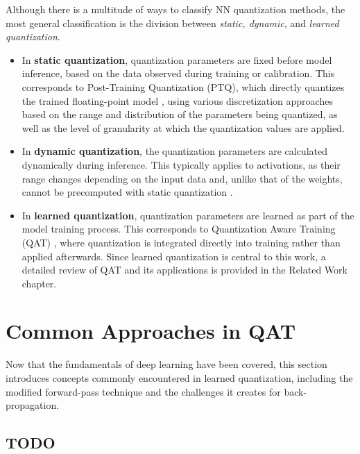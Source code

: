Although there is a multitude of ways to classify NN quantization methods, the most general classification is the division between \textit{static, dynamic}, and \textit{learned quantization}.
    \begin{itemize}
        \item In \textbf{static quantization}, quantization parameters are fixed before model inference, based on the data observed during training or calibration.
        This corresponds to Post-Training Quantization (PTQ), which directly quantizes the trained floating-point model \cite{jiang2021efficient}, 
        using various discretization approaches based on the range and distribution of the parameters being quantized, 
        as well as the level of granularity at which the quantization values are applied.
        
        \item In \textbf{dynamic quantization}, the quantization parameters are calculated dynamically during inference. 
        This typically applies to activations, as their range changes depending on the input data and, unlike that of the weights, 
        cannot be precomputed with static quantization \cite{kim2021ibert}.
        
        \item In \textbf{learned quantization}, quantization parameters are learned as part of the model training process.
        This corresponds to Quantization Aware Training (QAT) \cite{jacob2018quantization}, where quantization is integrated directly into training rather than applied afterwards.
        Since learned quantization is central to this work, a detailed review of QAT and its applications is provided in the Related Work chapter. 

    \end{itemize}

\section{Common Approaches in QAT}
\label{sec:section2}
Now that the fundamentals of deep learning have been covered, 
this section introduces concepts commonly encountered in learned quantization, 
including the modified forward-pass technique and the challenges it creates for back-propagation.

\subsection{TODO}
\label{subsec:subsection1}

